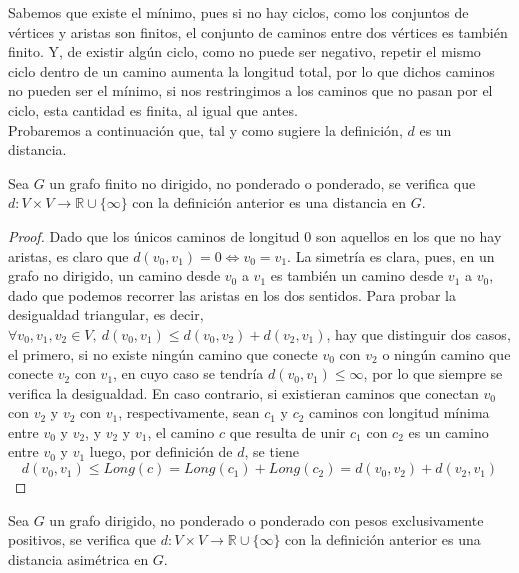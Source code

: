 Sabemos que existe el mínimo, pues si no hay ciclos, como los conjuntos de vértices y aristas son finitos, el conjunto de caminos entre dos vértices es también finito. Y, de existir algún ciclo, como no puede ser negativo, repetir el mismo ciclo dentro de un camino aumenta la longitud total, por lo que dichos caminos no pueden ser el mínimo, si nos restringimos a los caminos que no pasan por el ciclo, esta cantidad es finita, al igual que antes. \\

Probaremos a continuación que, tal y como sugiere la definición, $d$ es un distancia.

\begin{proposicion}\label{prop:distancia}
	Sea $G$ un grafo finito no dirigido, no ponderado o ponderado, se verifica que $d:V\times V \rightarrow \mathbb{R}\cup \{\infty\}$ con la definición anterior es una distancia en $G$.
\end{proposicion}

\begin{proof}
	Dado que los únicos caminos de longitud $0$ son aquellos en los que no hay aristas, es claro que $d(v_0, v_1) = 0 \Leftrightarrow v_0 = v_1$. La simetría es clara, pues, en un grafo no dirigido, un camino desde $v_0$ a $v_1$ es también un camino desde $v_1$ a $v_0$, dado que podemos recorrer las aristas en los dos sentidos. Para probar la desigualdad triangular, es decir, $\forall v_0, v_1, v_2 \in V,\ d(v_0,v_1) \leq d(v_0,v_2) + d(v_2,v_1)$, hay que distinguir dos casos, el primero, si no existe ningún camino que conecte $v_0$ con $v_2$ o ningún camino que conecte $v_2$ con $v_1$, en cuyo caso se tendría $d(v_0,v_1)\leq \infty$, por lo que siempre se verifica la desigualdad. En caso contrario, si existieran caminos que conectan $v_0$ con $v_2$ y $v_2$ con $v_1$, respectivamente, sean $c_1$ y $c_2$ caminos con longitud mínima entre $v_0$ y $v_2$, y $v_2$ y $v_1$, el camino $c$ que resulta de unir $c_1$ con $c_2$ es un camino entre $v_0$ y $v_1$ luego, por definición de $d$, se tiene
	$$d(v_0, v_1) \leq Long(c) = Long(c_1)+Long(c_2)=d(v_0,v_2)+d(v_2,v_1)$$
\end{proof}

\begin{proposicion}
	Sea $G$ un grafo dirigido, no ponderado o ponderado con pesos exclusivamente positivos, se verifica que $d:V\times V \rightarrow \mathbb{R}\cup \{\infty\}$ con la definición anterior es una distancia asimétrica en $G$.
\end{proposicion}

